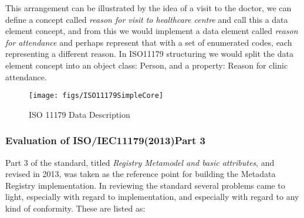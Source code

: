 \documentclass[runningheads]{llncs}
\begin{document}
	This arrangement can be illustrated by the idea of a visit to the doctor, we can define a concept called \emph{reason for visit to healthcare centre} and call this a data element concept, and from this we would implement a data element called \emph{reason for attendance} and perhaps represent that with a set of enumerated codes, each representing a different reason. In ISO11179 structuring we would split the data element concept into an object class: Person, and a property: Reason for clinic attendance. 
	
	
	\begin{figure}[h]
		\texttt{[image: figs/ISO11179SimpleCore]}
		\caption{ISO 11179 Data Description}
		\label{fig:ddview}
	\end{figure}
	
	
	\subsubsection{Evaluation of ISO/IEC11179(2013)Part 3}
	Part 3 of the standard, titled \emph{Registry Metamodel and basic attributes}, and revised in 2013, was taken as the reference point for building the Metadata Registry implementation. In reviewing the standard several problems came to light, especially with regard to implementation, and especially with regard to any kind of conformity. These are listed as:
\end{document}
